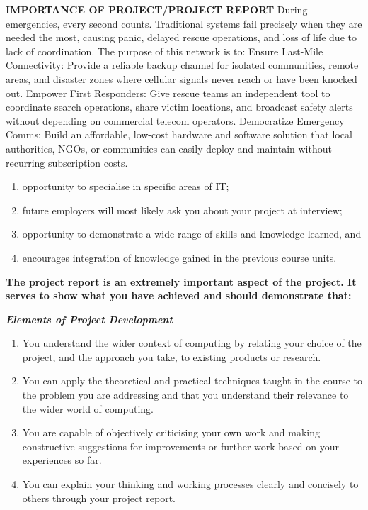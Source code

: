 \textbf{IMPORTANCE OF PROJECT/PROJECT REPORT}
During emergencies, every second counts. Traditional systems fail precisely when they are needed the most, causing panic, delayed rescue operations, and loss of life due to lack of coordination. The purpose of this network is to:
Ensure Last-Mile Connectivity: Provide a reliable backup channel for isolated communities, remote areas, and disaster zones where cellular signals never reach or have been knocked out.
Empower First Responders: Give rescue teams an independent tool to coordinate search operations, share victim locations, and broadcast safety alerts without depending on commercial telecom operators.
Democratize Emergency Comms: Build an affordable, low-cost hardware and software solution that local authorities, NGOs, or communities can easily deploy and maintain without recurring subscription costs.
\begin{enumerate}
\item[$\bullet$]opportunity to specialise in specific areas of IT;
\item[$\bullet$]future employers will most likely ask you about your project at interview;
\item[$\bullet$]opportunity to demonstrate a wide range of skills and knowledge learned, and
\item[$\bullet$]encourages integration of knowledge gained in the previous course units.
\end{enumerate}


\textbf{The project report is an extremely important aspect of the project. It serves to show what you have achieved and should demonstrate that:}

\textbf{\textit{Elements of Project Development}}
\begin{enumerate}


\item[$\bullet$]You understand the wider context of computing by relating your choice of the
project, and the approach you take, to existing products or research.

\item[$\bullet$]You can apply the theoretical and practical techniques taught in the course to
the problem you are addressing and that you understand their relevance to the
wider world of computing.

\item[$\bullet$]You are capable of objectively criticising your own work and making constructive suggestions for improvements or further work based on your experiences so far.

\item[$\bullet$]You can explain your thinking and working processes clearly and concisely to others through your project report.

\end{enumerate}
